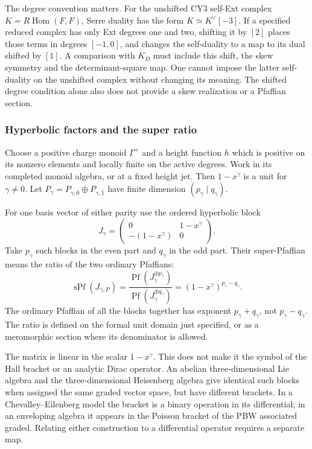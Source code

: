 The degree convention matters.  For the unshifted CY3 self-Ext
complex \(K=R\operatorname{Hom}(F,F)\), Serre duality has the form
\(K\simeq K^\vee[-3]\).  If a specified reduced complex has only
Ext degrees one and two, shifting it by \([2]\) places those terms
in degrees \([-1,0]\), and changes the self-duality to a map to its
dual shifted by \([1]\).  A comparison with \(K_D\) must include
this shift, the skew symmetry and the determinant-square map.
One cannot impose the latter self-duality on the unshifted complex
without changing its meaning.  The shifted degree condition alone
also does not provide a skew realization or a Pfaffian section.

\subsubsection*{Hyperbolic factors and the super ratio}

Choose a positive charge monoid \(\Gamma^+\) and a height function
\(h\) which is positive on its nonzero elements and locally finite
on the active degrees.  Work in its completed monoid algebra, or
at a fixed height jet.  Then \(1-x^\gamma\) is a unit for
\(\gamma\ne0\).  Let \(P_\gamma=P_{\gamma,\bar0}\oplus
P_{\gamma,\bar1}\) have finite dimension \((p_\gamma\mid q_\gamma)\).

\begin{definition}
\label{def:first-order-dirac-block}
For one basis vector of either parity use the ordered hyperbolic
block
\[
 J_\gamma=
 \begin{pmatrix}0&1-x^\gamma\\-(1-x^\gamma)&0\end{pmatrix}.
\]
Take \(p_\gamma\) such blocks in the even part and
\(q_\gamma\) in the odd part.  Their super-Pfaffian means the ratio
of the two ordinary Pfaffians:
\[
 \operatorname{sPf}(J_{\gamma,P})
 =\frac{\operatorname{Pf}(J_\gamma^{\oplus p_\gamma})}
        {\operatorname{Pf}(J_\gamma^{\oplus q_\gamma})}
 =(1-x^\gamma)^{p_\gamma-q_\gamma}.
\]
The ordinary Pfaffian of all the blocks together has exponent
\(p_\gamma+q_\gamma\), not \(p_\gamma-q_\gamma\).
The ratio is defined on the formal unit domain just specified, or
as a meromorphic section where its denominator is allowed.
\end{definition}

The matrix is linear in the scalar \(1-x^\gamma\).  This does not
make it the symbol of the Hall bracket or an analytic Dirac
operator.  An abelian three-dimensional Lie algebra and the
three-dimensional Heisenberg algebra give identical such blocks
when assigned the same graded vector space, but have different
brackets.  In a Chevalley--Eilenberg model the bracket is a binary
operation in its differential; in an enveloping algebra it appears
in the Poisson bracket of the PBW associated graded.  Relating either
construction to a differential operator requires a separate map.

